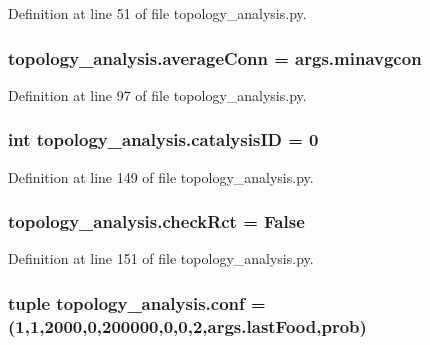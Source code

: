 Definition at line 51 of file topology\-\_\-analysis.\-py.

\hypertarget{a00128_a0d59133b2bb42e7aa26a3dba3a2a9a70}{
\subsubsection[{average\-Conn}]{\setlength{\rightskip}{0pt plus 5cm}topology\-\_\-analysis.\-average\-Conn = args.\-minavgcon}}\label{a00128_a0d59133b2bb42e7aa26a3dba3a2a9a70}


Definition at line 97 of file topology\-\_\-analysis.\-py.

\hypertarget{a00128_a35953bf84aa0f7a2a3ffa3f68190c0fa}{
\subsubsection[{catalysis\-I\-D}]{\setlength{\rightskip}{0pt plus 5cm}int topology\-\_\-analysis.\-catalysis\-I\-D = 0}}\label{a00128_a35953bf84aa0f7a2a3ffa3f68190c0fa}


Definition at line 149 of file topology\-\_\-analysis.\-py.

\hypertarget{a00128_a6f49caf3b9250cab918ae8dc5aef9931}{
\subsubsection[{check\-Rct}]{\setlength{\rightskip}{0pt plus 5cm}topology\-\_\-analysis.\-check\-Rct = False}}\label{a00128_a6f49caf3b9250cab918ae8dc5aef9931}


Definition at line 151 of file topology\-\_\-analysis.\-py.

\hypertarget{a00128_aa468c4ff92202c7d89fb631e8cb54dc8}{
\subsubsection[{conf}]{\setlength{\rightskip}{0pt plus 5cm}tuple topology\-\_\-analysis.\-conf = (1,1,2000,0,200000,0,0,2,args.\-last\-Food,{\bf prob})}}\label{a00128_aa468c4ff92202c7d89fb631e8cb54dc8}


